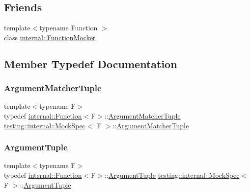 \subsection*{Friends}
\begin{DoxyCompactItemize}
\item 
{\footnotesize template$<$typename Function $>$ }\\class \hyperlink{classtesting_1_1internal_1_1_mock_spec_a6980863fff8693124aff79c507f87d45}{internal\+::\+Function\+Mocker}
\end{DoxyCompactItemize}


\subsection{Member Typedef Documentation}
\mbox{\label{classtesting_1_1internal_1_1_mock_spec_a35dc5836483cb8c6882c365c447b26cd}} 
\subsubsection{\texorpdfstring{Argument\+Matcher\+Tuple}{ArgumentMatcherTuple}}
{\footnotesize\ttfamily template$<$typename F$>$ \\
typedef \hyperlink{structtesting_1_1internal_1_1_function}{internal\+::\+Function}$<$F$>$\+::\hyperlink{classtesting_1_1internal_1_1_mock_spec_a35dc5836483cb8c6882c365c447b26cd}{Argument\+Matcher\+Tuple} \hyperlink{classtesting_1_1internal_1_1_mock_spec}{testing\+::internal\+::\+Mock\+Spec}$<$ F $>$\+::\hyperlink{classtesting_1_1internal_1_1_mock_spec_a35dc5836483cb8c6882c365c447b26cd}{Argument\+Matcher\+Tuple}}

\mbox{\label{classtesting_1_1internal_1_1_mock_spec_a7d520daca5d4d937578b4c7e8f0cf43e}} 
\subsubsection{\texorpdfstring{Argument\+Tuple}{ArgumentTuple}}
{\footnotesize\ttfamily template$<$typename F$>$ \\
typedef \hyperlink{structtesting_1_1internal_1_1_function}{internal\+::\+Function}$<$F$>$\+::\hyperlink{classtesting_1_1internal_1_1_mock_spec_a7d520daca5d4d937578b4c7e8f0cf43e}{Argument\+Tuple} \hyperlink{classtesting_1_1internal_1_1_mock_spec}{testing\+::internal\+::\+Mock\+Spec}$<$ F $>$\+::\hyperlink{classtesting_1_1internal_1_1_mock_spec_a7d520daca5d4d937578b4c7e8f0cf43e}{Argument\+Tuple}}




